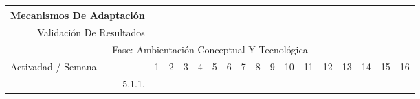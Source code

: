 \documentclass[12pt]{article}
\begin{document}
\begin{table}[H]
{\begin{tabular}{|rllllllllllllllll|}
        \multicolumn{1}{|r|}{Mecanismos De Adaptación} & \multicolumn{1}{l|}{} & \multicolumn{1}{l|}{} & \multicolumn{1}{l|}{} & \multicolumn{1}{l|}{} & \multicolumn{1}{l|}{} & \multicolumn{1}{l|}{} & \multicolumn{1}{l|}{} & \multicolumn{1}{l|}{} & \multicolumn{1}{l|}{} & \multicolumn{1}{c|}{\cellcolor[HTML]{B4A7D6}} & \multicolumn{1}{c|}{\cellcolor[HTML]{B4A7D6}} & \multicolumn{1}{c|}{\cellcolor[HTML]{B4A7D6}} & \multicolumn{1}{c|}{\cellcolor[HTML]{EA9999}} & \multicolumn{1}{l|}{} & \multicolumn{1}{l|}{} &  \\ \hline
        \multicolumn{1}{|r|}{Validación De Resultados} & \multicolumn{1}{l|}{} & \multicolumn{1}{l|}{} & \multicolumn{1}{l|}{} & \multicolumn{1}{l|}{} & \multicolumn{1}{l|}{} & \multicolumn{1}{l|}{} & \multicolumn{1}{l|}{} & \multicolumn{1}{l|}{} & \multicolumn{1}{l|}{} & \multicolumn{1}{l|}{} & \multicolumn{1}{l|}{} & \multicolumn{1}{c|}{\cellcolor[HTML]{B4A7D6}} & \multicolumn{1}{c|}{\cellcolor[HTML]{EA9999}} & \multicolumn{1}{c|}{\cellcolor[HTML]{EA9999}} & \multicolumn{1}{c|}{\cellcolor[HTML]{EA9999}} & \multicolumn{1}{c|}{\cellcolor[HTML]{EA9999}} \\ \hline
        \multicolumn{17}{|c|}{\cellcolor[HTML]{D9D9D9}Fase: Ambientación Conceptual Y Tecnológica} \\ \hline
        \multicolumn{1}{|l|}{\cellcolor[HTML]{D9D9D9}Activadad / Semana} & \multicolumn{1}{c|}{\cellcolor[HTML]{B6D7A8}1} & \multicolumn{1}{c|}{\cellcolor[HTML]{B6D7A8}2} & \multicolumn{1}{c|}{\cellcolor[HTML]{B6D7A8}3} & \multicolumn{1}{c|}{\cellcolor[HTML]{B6D7A8}4} & \multicolumn{1}{c|}{\cellcolor[HTML]{A4C2F4}5} & \multicolumn{1}{c|}{\cellcolor[HTML]{A4C2F4}6} & \multicolumn{1}{c|}{\cellcolor[HTML]{A4C2F4}7} & \multicolumn{1}{c|}{\cellcolor[HTML]{A4C2F4}8} & \multicolumn{1}{c|}{\cellcolor[HTML]{B4A7D6}9} & \multicolumn{1}{c|}{\cellcolor[HTML]{B4A7D6}10} & \multicolumn{1}{c|}{\cellcolor[HTML]{B4A7D6}11} & \multicolumn{1}{c|}{\cellcolor[HTML]{B4A7D6}12} & \multicolumn{1}{c|}{\cellcolor[HTML]{EA9999}13} & \multicolumn{1}{c|}{\cellcolor[HTML]{EA9999}14} & \multicolumn{1}{c|}{\cellcolor[HTML]{EA9999}15} & \multicolumn{1}{c|}{\cellcolor[HTML]{EA9999}16} \\ \hline
        \multicolumn{1}{|r|}{5.1.1.} & \multicolumn{1}{c|}{\cellcolor[HTML]{B6D7A8}} & \multicolumn{1}{l|}{} & \multicolumn{1}{l|}{} & \multicolumn{1}{l|}{} & \multicolumn{1}{l|}{} & \multicolumn{1}{l|}{} & \multicolumn{1}{l|}{} & \multicolumn{1}{l|}{} & \multicolumn{1}{l|}{} & \multicolumn{1}{l|}{} & \multicolumn{1}{l|}{} & \multicolumn{1}{l|}{} & \multicolumn{1}{l|}{} & \multicolumn{1}{l|}{} & \multicolumn{1}{l|}{} &  \\ \hline

\end{tabular}}
\end{table}
\end{document}
